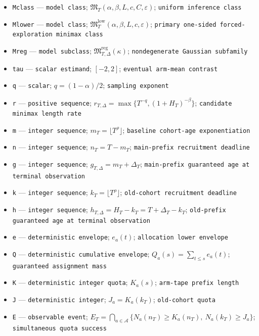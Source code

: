 \documentclass{article}
\begin{document}
\begin{itemize}
  \item \texttt{Mclass} --- \texttt{model class}; \(\mathfrak M_T(\alpha,\beta,L,c,C,\varepsilon)\); \texttt{uniform inference class}
  \item \texttt{Mlower} --- \texttt{model class}; \(\mathfrak M_T^{\mathrm{low}}(\alpha,\beta,L,c,\varepsilon)\); \texttt{primary one-\allowbreak{}sided forced-\allowbreak{}exploration minimax class}
  \item \texttt{Mreg} --- \texttt{model subclass}; \(\mathfrak M_{T,\Delta}^{\mathrm{reg}}(\kappa)\); \texttt{nondegenerate Gaussian subfamily}
  \item \texttt{tau} --- \texttt{scalar estimand}; \([-2,2]\); \texttt{eventual arm-\allowbreak{}mean contrast}
  \item \texttt{q} --- \texttt{scalar}; \(q=(1-\alpha)/2\); \texttt{sampling exponent}
  \item \texttt{r} --- \texttt{positive sequence}; \(r_{T,\Delta}=\max\{T^{-q},(1+H_T)^{-\beta}\}\); \texttt{candidate minimax length rate}
  \item \texttt{m} --- \texttt{integer sequence}; \(m_T=\lfloor T^\rho\rfloor\); \texttt{baseline cohort-\allowbreak{}age exponentiation}
  \item \texttt{n} --- \texttt{integer sequence}; \(n_T=T-m_T\); \texttt{main-\allowbreak{}prefix recruitment deadline}
  \item \texttt{g} --- \texttt{integer sequence}; \(g_{T,\Delta}=m_T+\Delta_T\); \texttt{main-\allowbreak{}prefix guaranteed age at terminal observation}
  \item \texttt{k} --- \texttt{integer sequence}; \(k_T=\lfloor T^\rho\rfloor\); \texttt{old-\allowbreak{}cohort recruitment deadline}
  \item \texttt{h} --- \texttt{integer sequence}; \(h_{T,\Delta}=H_T-k_T=T+\Delta_T-k_T\); \texttt{old-\allowbreak{}prefix guaranteed age at terminal observation}
  \item \texttt{e} --- \texttt{deterministic envelope}; \(e_a(t)\); \texttt{allocation lower envelope}
  \item \texttt{Q} --- \texttt{deterministic cumulative envelope}; \(Q_a(s)=\sum_{t\leq s}e_a(t)\); \texttt{guaranteed assignment mass}
  \item \texttt{K} --- \texttt{deterministic integer quota}; \(K_a(s)\); \texttt{arm-\allowbreak{}tape prefix length}
  \item \texttt{J} --- \texttt{deterministic integer}; \(J_a=K_a(k_T)\); \texttt{old-\allowbreak{}cohort quota}
  \item \texttt{E} --- \texttt{observable event}; \(E_T=\bigcap_{a\in\mathcal A}\{N_a(n_T)\geq K_a(n_T),\ N_a(k_T)\geq J_a\}\); \texttt{simultaneous quota success}

\end{itemize}
\end{document}
